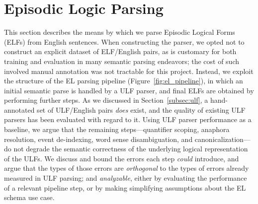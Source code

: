 \section{Episodic Logic Parsing}
\label{sec:parsing}
This section describes the means by which we parse Episodic Logical Forms (ELFs) from English sentences. When constructing the parser, we opted not to construct an explicit dataset of ELF/English pairs, as is customary for both training and evaluation in many semantic parsing endeavors; the cost of such involved manual annotation was not tractable for this project. Instead, we exploit the structure of the EL parsing pipeline (Figure~\ref{fig:el_pipeline}), in which an initial semantic parse is handled by a ULF parser, and final ELFs are obtained by performing further steps.
As we discussed in Section~\ref{subsec:ulf}, a hand-annotated set of ULF/English pairs \textit{does} exist, and the quality of existing ULF parsers has been evaluated with regard to it.
Using ULF parser performance as a baseline, we argue that the remaining steps---quantifier scoping, anaphora resolution, event de-indexing, word sense disambiguation, and canonicalization---do not degrade the semantic correctness of the underlying logical representation of the ULFs.
We discuss and bound the errors each step \textit{could} introduce, and argue that the types of those errors are \textit{orthogonal} to the types of errors already measured in ULF parsing; and \textit{analyzable}, either by evaluating the performance of a relevant pipeline step, or by making simplifying assumptions about the EL schema use case.

